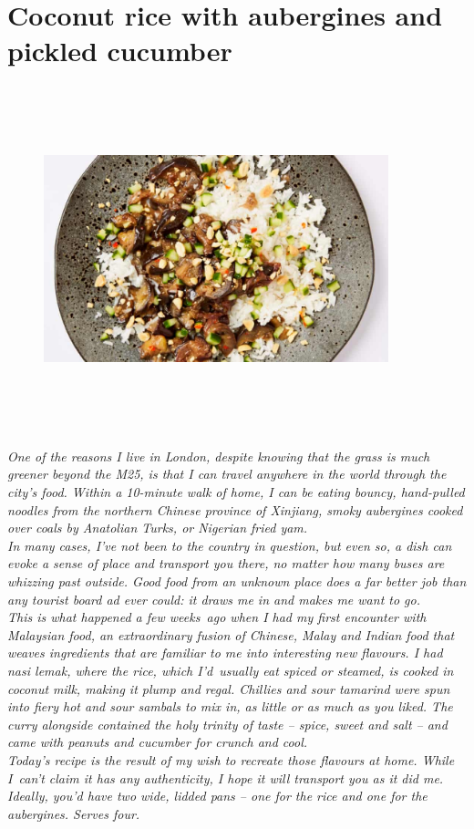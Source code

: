 \documentclass{book}
\begin{document}
\section{Coconut rice with aubergines and pickled cucumber }
\begin{figure}
\centering\includegraphics[width=10cm,height=10cm,keepaspectratio]{Recipe_Pictures/Coconut_rice_with_aubergines_and_pickled_cucumber_.png}
\end{figure}
\emph{One of the reasons I live in London, despite knowing that the grass is much greener beyond the M25, is that I can travel anywhere in the world through the city’s food. Within a 10-minute walk of home, I can be eating bouncy, hand-pulled noodles from the northern Chinese province of Xinjiang, smoky aubergines cooked over coals by Anatolian Turks, or Nigerian fried yam.\\ 
In many cases, I’ve not been to the country in question, but even so, a dish can evoke a sense of place and transport you there, no matter how many buses are whizzing past outside. Good food from an unknown place does a far better job than any tourist board ad ever could: it draws me in and makes me want to go.\\ 
This is what happened a few weeks ago when I had my first encounter with Malaysian food, an extraordinary fusion of Chinese, Malay and Indian food that weaves ingredients that are familiar to me into interesting new flavours. I had nasi lemak, where the rice, which I’d usually eat spiced or steamed, is cooked in coconut milk, making it plump and regal. Chillies and sour tamarind were spun into fiery hot and sour sambals to mix in, as little or as much as you liked. The curry alongside contained the holy trinity of taste – spice, sweet and salt – and came with peanuts and cucumber for crunch and cool.\\ 
Today’s recipe is the result of my wish to recreate those flavours at home. While I can’t claim it has any authenticity, I hope it will transport you as it did me.\\ 
Ideally, you’d have two wide, lidded pans – one for the rice and one for the aubergines. Serves four.}\\\\ 
\end{document}
